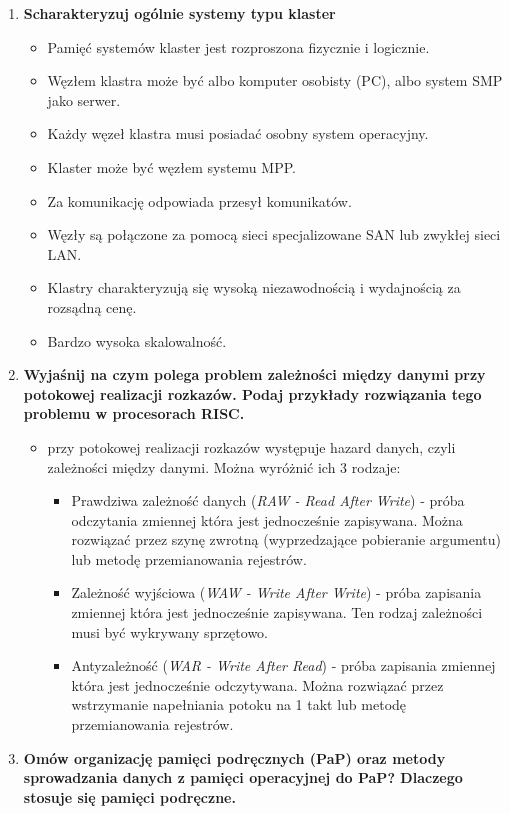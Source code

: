 \begin{enumerate}
\begin{itemize}
			\end{itemize}
			\item \textbf{Scharakteryzuj ogólnie systemy typu klaster}
			\begin{itemize}
				\item Pamięć systemów klaster jest rozproszona fizycznie i logicznie.
				\item Węzłem klastra może być albo komputer osobisty (PC), albo system SMP jako serwer.
				\item Każdy węzeł klastra musi posiadać osobny system operacyjny.
				\item Klaster może być węzłem systemu MPP.
				\item Za komunikację odpowiada przesył komunikatów.
				\item Węzły są połączone za pomocą sieci specjalizowane SAN lub zwykłej sieci LAN.
				\item Klastry charakteryzują się wysoką niezawodnością i wydajnością za rozsądną cenę.
				\item Bardzo wysoka skalowalność.
			\end{itemize}
			\item \textbf{Wyjaśnij na czym polega problem zależności między danymi przy potokowej realizacji rozkazów. Podaj przykłady rozwiązania tego problemu w procesorach RISC.}
			\begin{itemize}
				\item przy potokowej realizacji rozkazów występuje hazard danych, czyli zależności między danymi. Można wyróżnić ich 3 rodzaje:
				\begin{itemize}
					\item Prawdziwa zależność danych (\emph{RAW - Read After Write}) - próba odczytania zmiennej która jest jednocześnie zapisywana. Można rozwiązać przez szynę zwrotną (wyprzedzające pobieranie argumentu) lub metodę przemianowania rejestrów.
					\item Zależność wyjściowa (\emph{WAW - Write After Write}) - próba zapisania zmiennej która jest jednocześnie zapisywana. Ten rodzaj zależności musi być wykrywany sprzętowo.
					\item Antyzależność (\emph{WAR - Write After Read}) - próba zapisania zmiennej która jest jednocześnie odczytywana. Można rozwiązać przez wstrzymanie napełniania potoku na 1 takt lub metodę przemianowania rejestrów.
				\end{itemize}
			\end{itemize}
			\item \textbf{Omów organizację pamięci podręcznych (PaP) oraz metody sprowadzania danych z pamięci operacyjnej do PaP? Dlaczego stosuje się pamięci podręczne.}
		\end{enumerate}
	\newpage
